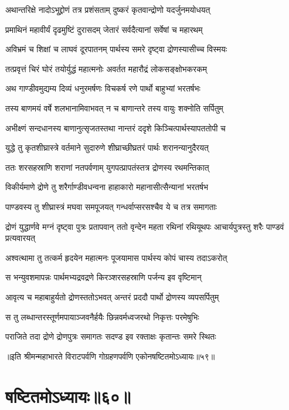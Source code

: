 \twolineshloka
{अथान्तरिक्षे नादोऽभूद्द्रोणं तत्र प्रशंसताम्}
{दुष्करं कृतवान्द्रोणो यदर्जुनमयोधयत्}


\twolineshloka
{प्रमाथिनं महावीर्यं दृढमुष्टिं दुरासदम्}
{जेतारं सर्वदैत्यानां सर्वेषां च महारथम्}


\twolineshloka
{अविभ्रमं च शिक्षां च लाघवं दूरपातनम्}
{पार्थस्य समरे दृष्ट्वा द्रोणस्यासीच्च विस्मयः}


\twolineshloka
{तत्प्रवृत्तं चिरं घोरं तयोर्युद्धं महात्मनोः}
{अवर्तत महारौद्रं लोकसङ्क्षोभकरकम्}


\twolineshloka
{अथ गाण्डीवमुद्यम्य दिव्यं धनुरमर्षणः}
{विचकर्ष रणे पार्थो बाहुभ्यां भरतर्षभः}


\twolineshloka
{तस्य बाणमयं वर्षे शलभानामिवाभवत्}
{न च बाणान्तरे तस्य वायुः शक्नोति सर्पितुम्}


\twolineshloka
{अभीक्ष्णं सन्दधानस्य बाणानुत्सृजतस्तथा}
{नान्तरं ददृशे किञ्चित्पार्थस्यापततोपी च}


\twolineshloka
{युद्धे तु कृतशीघ्रास्त्रे वर्तमाने सुदारुणे}
{शीघ्राच्छीघ्रतरं पार्थः शरानन्यानुदैरयत्}


\twolineshloka
{ततः शरसहस्राणि शराणां नतपर्वणाम्}
{युगपत्प्रापतंस्तत्र द्रोणस्य रथमन्तिकात्}


\twolineshloka
{विकीर्यमाणे द्रोणे तु शरैर्गाण्डीवधन्वना}
{हाहाकारो महानासीत्सैन्यानां भरतर्षभ}


\twolineshloka
{पाण्डवस्य तु शीघ्रास्त्रं मघवा समपूजयत्}
{गन्धर्वाप्सरसश्चैव ये च तत्र समागताः}


\threelineshloka
{द्रोणं युद्धार्णवे मग्नं दृष्ट्वा पुत्रः प्रतापवान्}
{ततो वृन्देन महता रथिनां रथियूथपः}
{आचार्यपुत्रस्तु शरैः पाण्डवं प्रत्यवारयत्}


\twolineshloka
{अश्वत्थामा तु तत्कर्म हृदयेन महात्मनः}
{पूजयामास पार्थस्य कोपं चास्य तदाऽकरोत्}


\twolineshloka
{स भन्युवशमापन्नः पार्थमभ्यद्रवद्रणे}
{किरञ्शरसहस्राणि पर्जन्य इव वृष्टिमान्}


\twolineshloka
{आवृत्य च महाबाहुर्यतो द्रोणस्ततोऽभवत्}
{अन्तरं प्रददौ पार्थो द्रोणस्य व्यपसर्पितुम्}


\twolineshloka
{स तु लब्धान्तरस्तूर्णमपायाञ्जवनैर्हयैः}
{छिन्नवर्मध्वजरथो निकृत्तः परमेषुभिः}


\twolineshloka
{पराजिते तदा द्रोणे द्रोणपुत्रः समागतः}
{सदण्ड इव रक्ताक्षः कृतान्तः समरे स्थितः}

॥इति श्रीमन्महाभारते विराटपर्वणि गोग्रहणपर्वणि एकोनषष्टितमोऽध्यायः॥५९॥

\chapter{षष्टितमोऽध्यायः॥६०॥}

